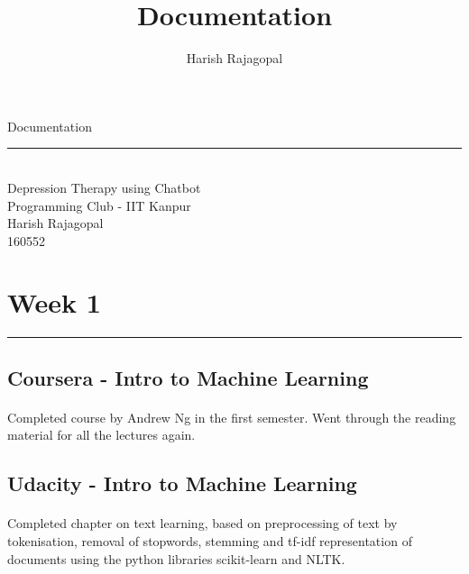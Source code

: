 \documentclass{article}
\title{Documentation}
\author{Harish Rajagopal}
\begin{document}
    
    \begin{center}
    {\fontsize{50}{60}\selectfont Documentation}
    {\rule{10cm}{1pt}}\\[3cm]
    {\fontsize{21}{30}\selectfont Depression Therapy using Chatbot\\[-1mm]
    Programming Club - IIT Kanpur\\[2cm]
    Harish Rajagopal\\[+2mm]
    160552}
    \end{center}
    
    \newpage
    \section*{\fontsize{25}{30}\selectfont \textbf{Week 1}}
        
        \vspace{-3mm}
        \rule{12cm}{0.5pt}
        \vspace{+6mm}
        \subsection*{\fontsize{16}{20}\selectfont Coursera - Intro to Machine Learning}
        	\vspace{+1mm}\paragraph{}{\fontsize{13}{16}\selectfont Completed course by Andrew Ng in the first semester. Went through the reading material for all the lectures again.}\\[-2mm]
        
        \subsection*{\fontsize{16}{20}\selectfont Udacity - Intro to Machine Learning}
        	\vspace{+1mm}\paragraph{}{\fontsize{13}{16}\selectfont Completed chapter on text learning, based on preprocessing of text by tokenisation, removal of stopwords, stemming and tf-idf representation of documents using the python libraries scikit-learn and NLTK.}\\[-2mm]
        
\end{document}
